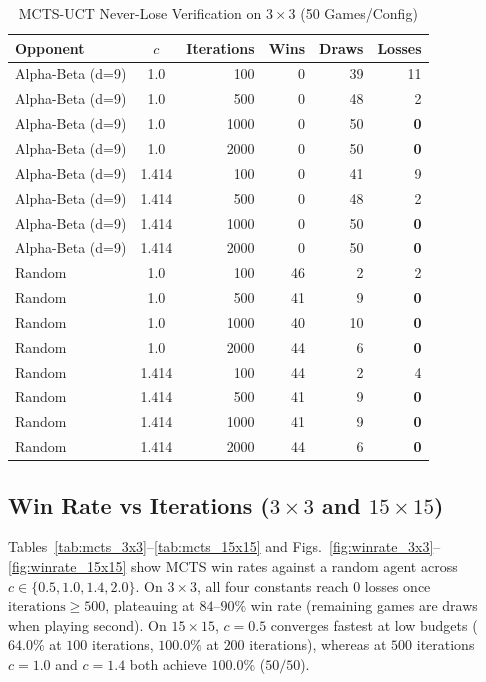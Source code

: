 \documentclass[conference]{IEEEtran}
\begin{document}
\begin{table}[t]
\centering
\caption{MCTS-UCT Never-Lose Verification on $3\times 3$ (50 Games/Config)}
\label{tab:never_lose}
\begin{tabular}{@{}lcrrrr@{}}
\toprule
Opponent & $c$ & Iterations & Wins & Draws & Losses \\
\midrule
Alpha-Beta (d=9) & 1.0 & 100 & 0 & 39 & 11 \\
Alpha-Beta (d=9) & 1.0 & 500 & 0 & 48 & 2 \\
Alpha-Beta (d=9) & 1.0 & 1000 & 0 & 50 & \textbf{0} \\
Alpha-Beta (d=9) & 1.0 & 2000 & 0 & 50 & \textbf{0} \\
Alpha-Beta (d=9) & 1.414 & 100 & 0 & 41 & 9 \\
Alpha-Beta (d=9) & 1.414 & 500 & 0 & 48 & 2 \\
Alpha-Beta (d=9) & 1.414 & 1000 & 0 & 50 & \textbf{0} \\
Alpha-Beta (d=9) & 1.414 & 2000 & 0 & 50 & \textbf{0} \\
\midrule
Random & 1.0 & 100 & 46 & 2 & 2 \\
Random & 1.0 & 500 & 41 & 9 & \textbf{0} \\
Random & 1.0 & 1000 & 40 & 10 & \textbf{0} \\
Random & 1.0 & 2000 & 44 & 6 & \textbf{0} \\
Random & 1.414 & 100 & 44 & 2 & 4 \\
Random & 1.414 & 500 & 41 & 9 & \textbf{0} \\
Random & 1.414 & 1000 & 41 & 9 & \textbf{0} \\
Random & 1.414 & 2000 & 44 & 6 & \textbf{0} \\
\bottomrule
\end{tabular}
\end{table}

\subsection{Win Rate vs Iterations ($3\times 3$ and $15\times 15$)}
Tables~\ref{tab:mcts_3x3}--\ref{tab:mcts_15x15} and Figs.~\ref{fig:winrate_3x3}--\ref{fig:winrate_15x15} show MCTS win rates against a random agent across $c \in \{0.5, 1.0, 1.4, 2.0\}$. On $3\times 3$, all four constants reach $0$ losses once $\text{iterations} \ge 500$, plateauing at $84$--$90\%$ win rate (remaining games are draws when playing second). On $15\times 15$, $c = 0.5$ converges fastest at low budgets ($64.0\%$ at $100$ iterations, $100.0\%$ at $200$ iterations), whereas at $500$ iterations $c = 1.0$ and $c = 1.4$ both achieve $100.0\%$ ($50/50$).
\end{document}
